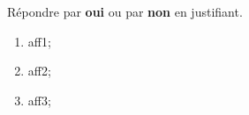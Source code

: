 \documentclass[exercice]{thedocument}%
\begin{document}
%
Répondre par {\bfseries oui} ou par {\bfseries non} en justifiant.
\begin{enumerate}
    \item \<aff1;
    \item \<aff2;
    \item \<aff3;
\end{enumerate}
\end{document}

